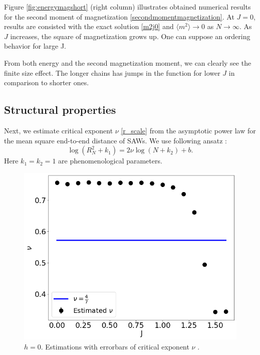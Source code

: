  Figure \ref{fig:energymagshort} (right column) illustrates obtained numerical results for the second moment of magnetization \eqref{secondmomentmagnetization}. At $J=0$, results are consisted with the exact solution \eqref{m2j0} and $  \langle m^2 \rangle  \rightarrow 0$ as $N \rightarrow \infty$. As $J$ increases, the square of magnetization grows up. One can suppose an ordering behavior for large J.
  
  From both energy and the second magnetization moment, we can clearly see the finite size effect. The longer chains has jumps in the function for lower $J$ in comparison to shorter ones. 
 
 
\subsection{Structural properties}
\label{structureprocedure}
Next, we estimate critical exponent $\nu$ \eqref{r_scale} from the asymptotic power law for the mean square end-to-end distance of SAWs. We use following ansatz  \cite{Berretti1985}:
\begin{equation}
\label{berettiscale}
\log (R_N^2+k_1 ) = 2 \nu \log (N+k_2) + b.
\end{equation}
Here $k_1=k_2=1$ are phenomenological parameters. 
 \begin{figure}[H]
	\centering
	\includegraphics[scale=0.36]{Images/nu_shortchains.png}
	\caption{$h=0$. Estimations with errorbars of critical exponent $\nu$ .   }
	\label{fig:nushort}
\end{figure}
 

